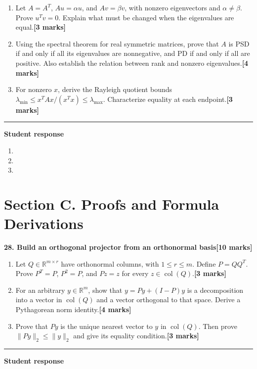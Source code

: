 \documentclass[11pt,a4paper]{article}
\newlength{\BlankAnswerHeight}\setlength{\BlankAnswerHeight}{16mm}
\newcommand{\AnswerBlank}{\leavevmode\par\vspace{\BlankAnswerHeight}}
\begin{document}
\begin{enumerate}[label=(\alph*),leftmargin=8mm,itemsep=3pt]
\item Let \(A=A^T\), \(Au=\alpha u\), and \(Av=\beta v\), with nonzero eigenvectors and \(\alpha\neq\beta\). Prove \(u^Tv=0\). Explain what must be changed when the eigenvalues are equal.\hfill\textbf{[3 marks]}
\item Using the spectral theorem for real symmetric matrices, prove that \(A\) is PSD if and only if all its eigenvalues are nonnegative, and PD if and only if all are positive. Also establish the relation between rank and nonzero eigenvalues.\hfill\textbf{[4 marks]}
\item For nonzero \(x\), derive the Rayleigh quotient bounds \(\lambda_{\min}\leq x^TAx/(x^Tx)\leq\lambda_{\max}\). Characterize equality at each endpoint.\hfill\textbf{[3 marks]}
\end{enumerate}\par\medskip\hrule\medskip\textbf{Student response}\par
\begin{enumerate}[label=(\alph*),leftmargin=8mm,itemsep=3pt]
\item
\AnswerBlank
\item
\AnswerBlank
\item
\AnswerBlank
\end{enumerate}
\newpage\section*{Section C. Proofs and Formula Derivations}
\textbf{28. Build an orthogonal projector from an orthonormal basis}\hfill\textbf{[10 marks]}\par\medskip
\begin{enumerate}[label=(\alph*),leftmargin=8mm,itemsep=3pt]
\item Let \(Q\in\mathbb R^{m\times r}\) have orthonormal columns, with \(1\leq r\leq m\). Define \(P=QQ^T\). Prove \(P^T=P\), \(P^2=P\), and \(Pz=z\) for every \(z\in\operatorname{col}(Q)\).\hfill\textbf{[3 marks]}
\item For an arbitrary \(y\in\mathbb R^m\), show that \(y=Py+(I-P)y\) is a decomposition into a vector in \(\operatorname{col}(Q)\) and a vector orthogonal to that space. Derive a Pythagorean norm identity.\hfill\textbf{[4 marks]}
\item Prove that \(Py\) is the unique nearest vector to \(y\) in \(\operatorname{col}(Q)\). Then prove \(\|Py\|_2\leq\|y\|_2\) and give its equality condition.\hfill\textbf{[3 marks]}
\end{enumerate}\par\medskip\hrule\medskip\textbf{Student response}\par
\end{document}
